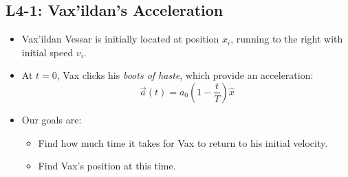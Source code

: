 \documentclass[]{article}
\begin{document}
\begin{PresentSpace}
\vspace{-10pt}
\section*{L4-1: Vax'ildan's Acceleration}
\vspace{-20pt}
\begin{multicols}{2}
\begin{itemize}
	\item Vax'ildan Vessar is initially located at position $x_{i}$, running to the right with initial speed $v_{i}$.
	\item At $t=0$, Vax clicks his \textit{boots of haste}, which provide an acceleration:
	\vspace{-10pt}
	\[
	\vec{a}(t) = a_{0}\left(1-\frac{t}{T}\right)\hat{x}
	\]
	\vspace{-20pt}
	\item Our goals are:
	\begin{itemize}
		\item Find how much time it takes for Vax to return to his initial velocity.
		\item Find Vax's position at this time.
	\end{itemize}
\end{itemize}
\begin{center}
\end{center}
\end{multicols}

\end{PresentSpace}
\end{document}
